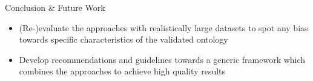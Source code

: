 \documentclass[final,hyperref={pdfpagelabels=true}]{beamer}
\begin{document}
\begin{frame}
\begin{columns}[t, onlytextwidth]
\begin{column}{\textwidth}
\begin{columns}[t, onlytextwidth]
\begin{column}{.49\textwidth}
\begin{block}{Conclusion \& Future Work}
\begin{minipage}[t][.25\textheight][c]{\textwidth}
						\begin{itemize}
							\small
							\justifying
							\setlength\itemsep{1cm}
							\item (Re-)evaluate the approaches with realistically large datasets to spot any bias towards specific characteristics of the validated ontology
							\item Develop recommendations and guidelines towards a generic framework which combines the approaches to achieve high quality results
						\end{itemize}
					\end{minipage}
				\end{block}
			\end{column}
		\end{columns}
		
    \end{column}

  \end{columns}
\end{frame}
\end{document}

